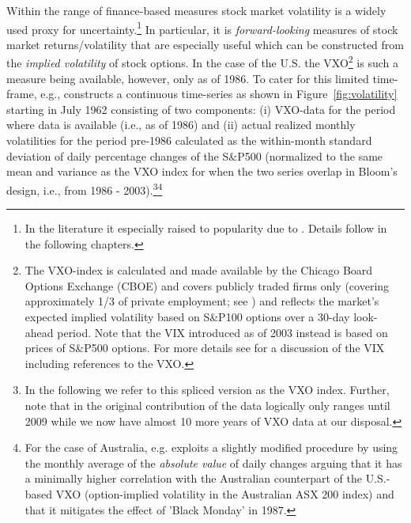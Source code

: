 \documentclass[a4paper,11pt,listof=nochaptergap,oneside,pointednumbers,bibtotoc,bigheadings,liststotoc]{scrbook}
\begin{document}
Within the range of finance-based measures stock market volatility is a widely used proxy for uncertainty.\footnote{In the literature it especially raised to popularity due to \citet{bloom:09}. Details follow in the following chapters.} In particular, it is \textit{forward-looking} measures of stock market returns/volatility that are especially useful which can be constructed from the \textit{implied volatility} of stock options. In the case of the U.S. the VXO\footnote{The VXO-index is calculated and made available by the Chicago Board Options Exchange (CBOE) and covers publicly traded firms only (covering approximately 1/3 of private employment; see \citealp{davisetal:06}) and reflects the market's expected implied volatility based on S\&P100 options over a 30-day look-ahead period. Note that the VIX introduced as of 2003 instead is based on prices of S\&P500 options. For more details see \citet{cboe:09} for a discussion of the VIX including references to the VXO.} is such a measure being available, however, only as of 1986. To cater for this limited time-frame, e.g., \citet{bloom:09} constructs a continuous time-series as shown in Figure~\ref{fig:volatility} starting in July 1962 consisting of two components: (i) VXO-data for the period where data is available (i.e., as of 1986) and (ii) actual realized monthly volatilities for the period pre-1986 calculated as the within-month standard deviation of daily percentage changes of the S\&P500 (normalized to the same mean and variance as the VXO index for when the two series overlap in Bloom's design, i.e., from 1986 - 2003).\footnote{In the following we refer to this spliced version as the VXO index. Further, note that in the original contribution of \citet{bloom:09} the data logically only ranges until 2009 while we now have almost 10 more years of VXO data at our disposal.}\footnote{For the case of Australia, e.g. \citet{moore:17} exploits a slightly modified procedure by using the monthly average of the \textit{absolute value} of daily changes arguing that it has a minimally higher correlation with the Australian counterpart of the U.S.-based VXO (option-implied volatility in the Australian ASX 200 index) and that it mitigates the effect of 'Black Monday' in 1987.}
\end{document}
